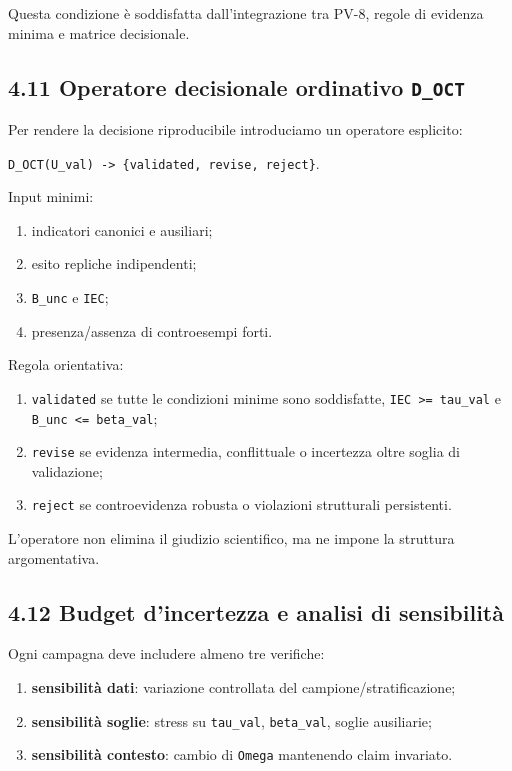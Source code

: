 Questa condizione è soddisfatta dall'integrazione tra PV-8, regole di evidenza minima e matrice decisionale.

\subsection{\texorpdfstring{4.11 Operatore decisionale ordinativo \texttt{D\_OCT}}{4.11 Operatore decisionale ordinativo D\_OCT}}

Per rendere la decisione riproducibile introduciamo un operatore esplicito:

\texttt{D\_OCT(U\_val)\ -\textgreater{}\ \{validated,\ revise,\ reject\}}.

Input minimi:

\begin{enumerate}
\def\labelenumi{\arabic{enumi}.}
\tightlist
\item
  indicatori canonici e ausiliari;
\item
  esito repliche indipendenti;
\item
  \texttt{B\_unc} e \texttt{IEC};
\item
  presenza/assenza di controesempi forti.
\end{enumerate}

Regola orientativa:

\begin{enumerate}
\def\labelenumi{\arabic{enumi}.}
\tightlist
\item
  \texttt{validated} se tutte le condizioni minime sono soddisfatte, \texttt{IEC\ \textgreater{}=\ tau\_val} e \texttt{B\_unc\ \textless{}=\ beta\_val};
\item
  \texttt{revise} se evidenza intermedia, conflittuale o incertezza oltre soglia di validazione;
\item
  \texttt{reject} se controevidenza robusta o violazioni strutturali persistenti.
\end{enumerate}

L'operatore non elimina il giudizio scientifico, ma ne impone la struttura argomentativa.

\subsection{4.12 Budget d'incertezza e analisi di sensibilità}

Ogni campagna deve includere almeno tre verifiche:

\begin{enumerate}
\def\labelenumi{\arabic{enumi}.}
\tightlist
\item
  \textbf{sensibilità dati}: variazione controllata del campione/stratificazione;
\item
  \textbf{sensibilità soglie}: stress su \texttt{tau\_val}, \texttt{beta\_val}, soglie ausiliarie;
\item
  \textbf{sensibilità contesto}: cambio di \texttt{Omega} mantenendo claim invariato.
\end{enumerate}

